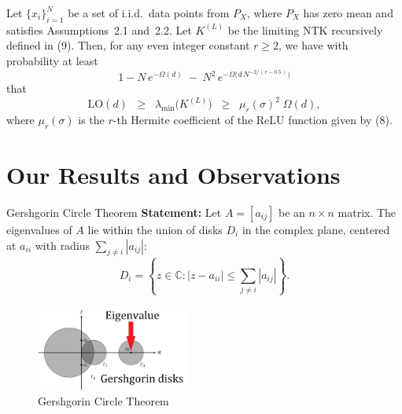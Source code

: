 \documentclass[serif, aspectratio=169]{beamer}
\begin{document}
\begin{frame}
	\begin{theorem}
		\label{thm:smallest-eig-NTK}
		Let $\{x_i\}_{i=1}^N$ be a set of i.i.d.\ data points from $P_X$, where $P_X$ has 
		zero mean and satisfies Assumptions~2.1 and~2.2. Let $K^{(L)}$ be the limiting 
		NTK recursively defined in (9). Then, for any even integer constant $r \ge 2$, 
		we have with probability at least 
		\[
		1 - N\,e^{-\Omega(d)} \;-\; N^2\,e^{-\Omega\bigl(d\,N^{-2/(\,r - 0.5\,)}\bigr)}
		\]
		that
		\[
		\mathrm{LO}(d) 
		\;\;\ge\;\;
		\lambda_{\min}\bigl(K^{(L)}\bigr) 
		\;\;\ge\;\;
		\mu_{r}(\sigma)^{2}\;\Omega(d),
		\]
		where $\mu_{r}(\sigma)$ is the $r$-th Hermite coefficient of the ReLU function 
		given by (8).
	\end{theorem}
\end{frame}


\section{Our Results and Observations}


\begin{frame}{Gershgorin Circle Theorem}
	\textbf{Statement:} Let \( A = [a_{ij}] \) be an \( n \times n \) matrix. The eigenvalues of \( A \) lie within the union of disks \( D_i \) in the complex plane, centered at \( a_{ii} \) with radius \( \sum_{j \neq i} |a_{ij}| \):
	\[
	D_i = \left\{ z \in \mathbb{C} : |z - a_{ii}| \leq \sum_{j \neq i} |a_{ij}| \right\}.
	\]


    \begin{figure}
		\centering
		\includegraphics[width=0.45\textwidth]{pic/gresh.jpg}
		\caption{Gershgorin Circle Theorem}
	\end{figure}
\end{frame}
\end{document}
